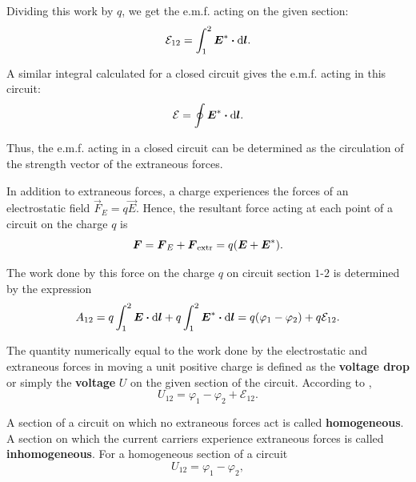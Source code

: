 \noindent
Dividing this work by $q$, we get the e.m.f. acting on the given section:
\begin{equation}\label{eq:5_15}
    \mathcal{E}_{12} = \int_1^2 \boldsymbol{E}^* \boldsymbol{\cdot} \mathrm{d}\boldsymbol{l}.
\end{equation}

\noindent
A similar integral calculated for a closed circuit gives the e.m.f. acting in this circuit:
\begin{equation}\label{eq:5_16}
    \mathcal{E} = \oint \boldsymbol{E}^* \boldsymbol{\cdot} \mathrm{d}\boldsymbol{l}.
\end{equation}

\noindent
Thus, the e.m.f. acting in a closed circuit can be determined as the circulation of the strength vector of the extraneous forces.

In addition to extraneous forces, a charge experiences the forces of an electrostatic field $\vec{F}_E=q\vec{E}$. Hence, the resultant force acting at each point of a circuit on the charge $q$ is
\begin{equation*}
    \boldsymbol{F} = \boldsymbol{F}_E + \boldsymbol{F}_{\text{extr}} = q (\boldsymbol{E} + \boldsymbol{E}^*).
\end{equation*}

\noindent
The work done by this force on the charge $q$ on circuit section $1$-$2$ is determined by the expression
\begin{equation}\label{eq:5_17}
    A_{12} = q \int_1^2 \boldsymbol{E} \boldsymbol{\cdot} \mathrm{d}\boldsymbol{l} + q \int_1^2 \boldsymbol{E}^* \boldsymbol{\cdot} \mathrm{d}\boldsymbol{l} = q (\varphi_1 - \varphi_2) + q \mathcal{E}_{12}.
\end{equation}

The quantity numerically equal to the work done by the electrostatic and extraneous forces in moving a unit positive charge is defined as the \textbf{voltage drop} or simply the \textbf{voltage} $U$ on the given section of the circuit. According to ,
\begin{equation}\label{eq:5_18}
    U_{12} = \varphi_1 - \varphi_2 + \mathcal{E}_{12}.
\end{equation}

A section of a circuit on which no extraneous forces act is called \textbf{homogeneous}. A section on which the current carriers experience extraneous forces is called \textbf{inhomogeneous}. For a homogeneous section of a circuit
\begin{equation}\label{eq:5_19}
    U_{12} = \varphi_1 - \varphi_2,
\end{equation}

